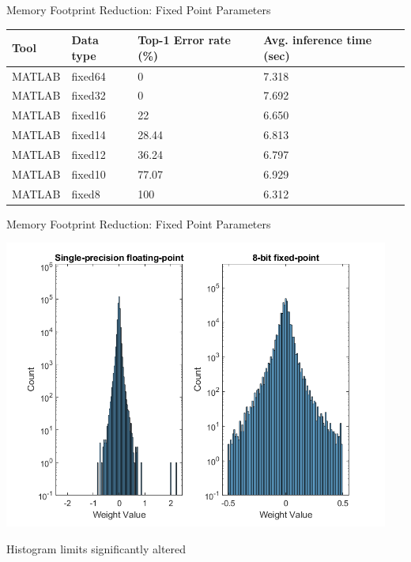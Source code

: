 \begin{frame}{Memory Footprint Reduction: Fixed Point Parameters}
	\begin{table}[H]
		\centering
		\begin{tabular}{p{2cm} p{2cm} p{3cm} p{3cm}}
			\toprule
			\textbf{Tool} & \textbf{Data type} & \textbf{Top-1 Error rate (\%)} & \textbf{Avg. inference time (sec)} \\
			\midrule
			MATLAB        & fixed64            & 0                              & 7.318                              \\
			MATLAB        & fixed32            & 0                              & 7.692                              \\
			MATLAB        & fixed16            & 22                             & 6.650                              \\
			MATLAB        & fixed14            & 28.44                          & 6.813                              \\
			MATLAB        & fixed12            & 36.24                          & 6.797                              \\
			MATLAB        & fixed10            & 77.07                          & 6.929                              \\
			MATLAB        & fixed8             & 100                            & 6.312                              \\
			\bottomrule
		\end{tabular}
	\end{table}
\end{frame}

\begin{frame}{Memory Footprint Reduction: Fixed Point Parameters}
	\begin{minipage}{0.6\textwidth}
		\centering
		\includegraphics[width=0.95\textwidth]{../Images/Weights-distributions/original-vs-fixed8/weight-distribution-conv2.png}\\
	\end{minipage}%
	\begin{minipage}{0.4\textwidth}
		\large Histogram limits significantly altered\\
	\end{minipage}
\end{frame}

